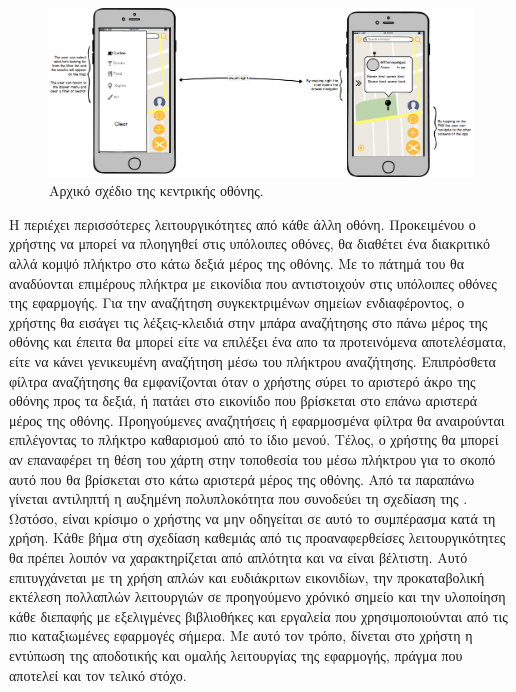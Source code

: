 \begin{figure}[H]
    \centering
    \includegraphics[scale=0.25]{figures/home.png}
    \caption{Αρχικό σχέδιο της κεντρικής οθόνης.}
    \label{homemockup}
\end{figure}

\indent
Η  περιέχει περισσότερες λειτουργικότητες από κάθε άλλη οθόνη. Προκειμένου ο χρήστης να μπορεί να πλοηγηθεί στις υπόλοιπες οθόνες, θα διαθέτει ένα διακριτικό αλλά κομψό πλήκτρο στο κάτω δεξιά μέρος της οθόνης. Με το πάτημά του θα αναδύονται επιμέρους πλήκτρα με εικονίδια που αντιστοιχούν στις υπόλοιπες οθόνες της εφαρμογής. Για την αναζήτηση συγκεκτριμένων σημείων ενδιαφέροντος, ο χρήστης θα εισάγει τις λέξεις-κλειδιά στην μπάρα αναζήτησης στο πάνω μέρος της οθόνης και έπειτα θα μπορεί είτε να επιλέξει ένα απο τα προτεινόμενα αποτελέσματα, είτε να κάνει γενικευμένη αναζήτηση μέσω του πλήκτρου αναζήτησης. Επιπρόσθετα φίλτρα αναζήτησης θα εμφανίζονται όταν ο χρήστης σύρει το αριστερό άκρο της οθόνης προς τα δεξιά, ή πατάει στο εικονίιδο που βρίσκεται στο επάνω αριστερά μέρος της οθόνης. Προηγούμενες αναζητήσεις ή εφαρμοσμένα φίλτρα θα αναιρούνται επιλέγοντας το πλήκτρο καθαρισμού από το ίδιο μενού. Τέλος, ο χρήστης θα μπορεί αν επαναφέρει τη θέση του χάρτη στην τοποθεσία του μέσω πλήκτρου για το σκοπό αυτό που θα βρίσκεται στο κάτω αριστερά μέρος της οθόνης. 
\newline
\indent
Από τα παραπάνω γίνεται αντιληπτή η αυξημένη πολυπλοκότητα που συνοδεύει τη σχεδίαση της . Ωστόσο, είναι κρίσιμο ο χρήστης να μην οδηγείται σε αυτό το συμπέρασμα κατά τη χρήση. Κάθε βήμα στη σχεδίαση καθεμιάς από τις προαναφερθείσες λειτουργικότητες θα πρέπει λοιπόν να χαρακτηρίζεται από απλότητα και να είναι βέλτιστη. Αυτό επιτυγχάνεται με τη χρήση απλών και ευδιάκριτων εικονιδίων, την προκαταβολική εκτέλεση πολλαπλών λειτουργιών σε προηγούμενο χρόνικό σημείο και την υλοποίηση κάθε διεπαφής με εξελιγμένες βιβλιοθήκες και εργαλεία που χρησιμοποιούνται από τις πιο καταξιωμένες εφαρμογές σήμερα. Με αυτό τον τρόπο, δίνεται στο χρήστη η εντύπωση της αποδοτικής και ομαλής λειτουργίας της εφαρμογής, πράγμα που αποτελεί και τον τελικό στόχο.


